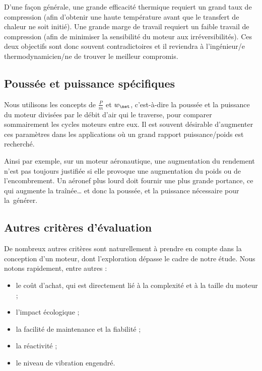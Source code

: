 		D’une façon générale, une grande efficacité thermique requiert un grand taux de compression (afin d’obtenir une haute température avant que le transfert de chaleur ne soit initié). Une grande marge de travail requiert un faible travail de compression (afin de minimiser la sensibilité du moteur aux irréversibilités). Ces deux objectifs sont donc souvent contradictoires et il reviendra à l’ingénieur/e thermodynamicien/ne de trouver le meilleur compromis.


	\subsection{Poussée et puissance spécifiques}
	\label{ch_poussee_puissance_specifiques}

		Nous utilisons les concepts de  $\frac{P}{\dot m}$ et  $w_\net$, c’est-à-dire la poussée et la puissance du moteur divisées par le débit d’air qui le traverse, pour comparer sommairement les cycles moteurs entre eux. Il est souvent désirable d’augmenter ces paramètres dans les applications où un grand rapport puissance/poids est recherché.

		Ainsi par exemple, sur un moteur aéronautique, une augmentation du rendement n’est pas toujours justifiée si elle provoque une augmentation du poids ou de l’encombrement. Un aéronef plus lourd doit fournir une plus grande portance, ce qui augmente la traînée… et donc la poussée, et la puissance nécessaire pour la~générer.

	
	\subsection{Autres critères d’évaluation}
	
		De nombreux autres critères sont naturellement à prendre en compte dans la conception d’un moteur, dont l’exploration dépasse le cadre de notre étude. Nous notons rapidement, entre autres :
		
		\begin{itemize}
			\item le coût d’achat, qui est directement lié à la complexité et à la taille du moteur ;
			\item l’impact écologique ;
			\item la facilité de maintenance et la fiabilité ;
			\item la réactivité ;
			\item le niveau de vibration engendré.
		\end{itemize}

